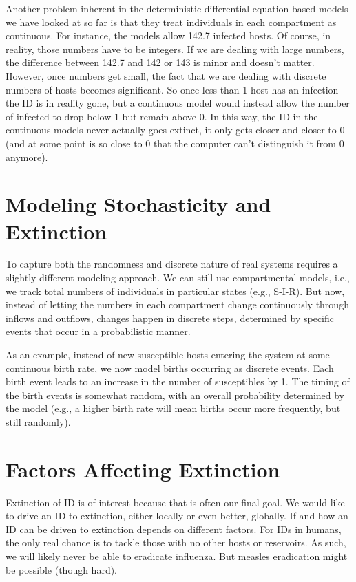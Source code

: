 \documentclass[]{book}
\theoremstyle{definition}
\theoremstyle{definition}
\theoremstyle{definition}
\theoremstyle{remark}
\begin{document}
Another problem inherent in the deterministic differential equation
based models we have looked at so far is that they treat individuals in
each compartment as continuous. For instance, the models allow 142.7
infected hosts. Of course, in reality, those numbers have to be
integers. If we are dealing with large numbers, the difference between
142.7 and 142 or 143 is minor and doesn't matter. However, once numbers
get small, the fact that we are dealing with discrete numbers of hosts
becomes significant. So once less than 1 host has an infection the ID is
in reality gone, but a continuous model would instead allow the number
of infected to drop below 1 but remain above 0. In this way, the ID in
the continuous models never actually goes extinct, it only gets closer
and closer to 0 (and at some point is so close to 0 that the computer
can't distinguish it from 0 anymore).

\section{Modeling Stochasticity and
Extinction}\label{modeling-stochasticity-and-extinction}

To capture both the randomness and discrete nature of real systems
requires a slightly different modeling approach. We can still use
compartmental models, i.e., we track total numbers of individuals in
particular states (e.g., S-I-R). But now, instead of letting the numbers
in each compartment change continuously through inflows and outflows,
changes happen in discrete steps, determined by specific events that
occur in a probabilistic manner.

As an example, instead of new susceptible hosts entering the system at
some continuous birth rate, we now model births occurring as discrete
events. Each birth event leads to an increase in the number of
susceptibles by 1. The timing of the birth events is somewhat random,
with an overall probability determined by the model (e.g., a higher
birth rate will mean births occur more frequently, but still randomly).

\section{Factors Affecting
Extinction}\label{factors-affecting-extinction}

Extinction of ID is of interest because that is often our final goal. We
would like to drive an ID to extinction, either locally or even better,
globally. If and how an ID can be driven to extinction depends on
different factors. For IDs in humans, the only real chance is to tackle
those with no other hosts or reservoirs. As such, we will likely never
be able to eradicate influenza. But measles eradication might be
possible (though hard).
\end{document}
